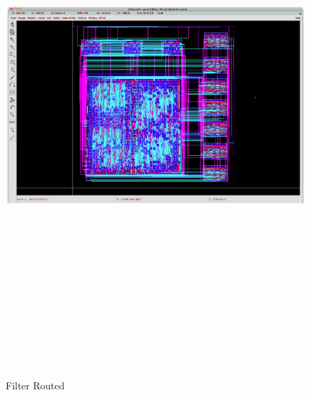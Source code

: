 \begin{figure}[htbp]
\centering
\includegraphics[angle=90,height=8in]{images/FinalRouted}
\caption{Filter Routed}
\label{fig:filterrouted}
\end{figure}





